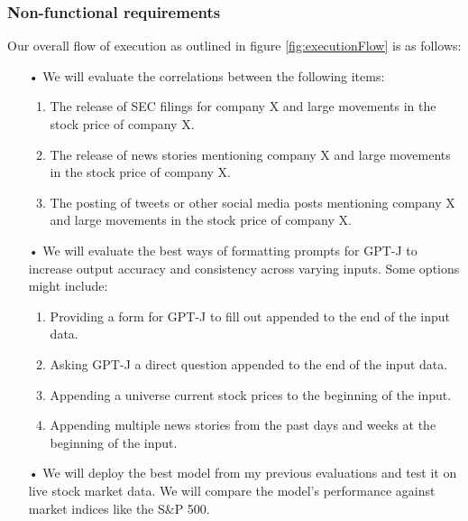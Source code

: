 \documentclass[conference]{IEEEtran}
\begin{document}
\subsubsection{Non-functional requirements}
Our overall flow of execution as outlined in figure \ref{fig:executionFlow} is as follows:
\begin{enumerate}
    \item[•] We will evaluate the correlations between the following items:
          \begin{enumerate}
            \item The release of SEC filings for company X and large movements in the stock price of company X.
            \item The release of news stories mentioning company X and large movements in the stock price of company X.
            \item The posting of tweets or other social media posts mentioning company X and large movements in the stock price of company X.
          \end{enumerate}
    \item[•] We will evaluate the best ways of formatting prompts for GPT-J to increase output accuracy and consistency across varying inputs. Some options might include:
          \begin{enumerate}
            \item Providing a form for GPT-J to fill out appended to the end of the input data.
            \item Asking GPT-J a direct question appended to the end of the input data.
            \item Appending a universe current stock prices to the beginning of the input.
            \item Appending multiple news stories from the past days and weeks at the beginning of the input.
          \end{enumerate}
    \item[•] We will deploy the best model from my previous evaluations and test it on live stock market data. We will compare the model's performance against market indices like the S\&P 500. 
\end{enumerate}
\end{document}
